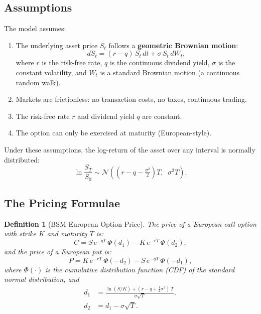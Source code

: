 \documentclass[12pt, a4paper]{article}
\newtheorem{definition}{Definition}
\begin{document}
\subsection{Assumptions}

The model assumes:
\begin{enumerate}[nosep]
    \item The underlying asset price $S_t$ follows a \textbf{geometric Brownian
          motion}:
          \begin{equation}
              dS_t = (r - q)\,S_t\,dt + \sigma\,S_t\,dW_t,
              \label{eq:gbm}
          \end{equation}
          where $r$ is the risk-free rate, $q$ is the continuous dividend yield,
          $\sigma$ is the constant volatility, and $W_t$ is a standard Brownian
          motion (a continuous random walk).
    \item Markets are frictionless: no transaction costs, no taxes, continuous
          trading.
    \item The risk-free rate $r$ and dividend yield $q$ are constant.
    \item The option can only be exercised at maturity (European-style).
\end{enumerate}

Under these assumptions, the log-return of the asset over any interval is
normally distributed:
\begin{equation}
    \ln\!\frac{S_T}{S_0} \sim \mathcal{N}\!\left(\left(r - q - \tfrac{\sigma^2}{2}\right)T,\;\; \sigma^2 T\right).
    \label{eq:log_return}
\end{equation}

\subsection{The Pricing Formulae}

\begin{definition}[BSM European Option Price]
The price of a European call option with strike $K$ and maturity $T$ is:
\begin{equation}
    C = S\,e^{-qT}\,\Phi(d_1) - K\,e^{-rT}\,\Phi(d_2),
    \label{eq:bsm_call}
\end{equation}
and the price of a European put is:
\begin{equation}
    P = K\,e^{-rT}\,\Phi(-d_2) - S\,e^{-qT}\,\Phi(-d_1),
    \label{eq:bsm_put}
\end{equation}
where $\Phi(\cdot)$ is the cumulative distribution function (CDF) of the
standard normal distribution, and
\begin{align}
    d_1 &= \frac{\ln(S/K) + (r - q + \tfrac{1}{2}\sigma^2)\,T}{\sigma\sqrt{T}},
    \label{eq:d1} \\[4pt]
    d_2 &= d_1 - \sigma\sqrt{T}.
    \label{eq:d2}
\end{align}
\end{definition}
\end{document}
